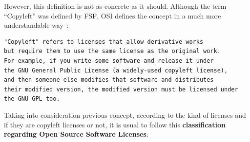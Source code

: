 \documentclass[a4paper, 12pt]{book}
\begin{document}
However, this definition is not as concrete as it should. Although the term ``Copyleft'' was defined by FSF, OSI defines the concept in a much more understandable way~\cite{OSICopyleft}:
\begin{verbatim}
"Copyleft" refers to licenses that allow derivative works
but require them to use the same license as the original work.
For example, if you write some software and release it under
the GNU General Public License (a widely-used copyleft license),
and then someone else modifies that software and distributes
their modified version, the modified version must be licensed under
the GNU GPL too.
\end{verbatim}
Taking into consideration previous concept, according to the kind of licenses and if they are copyleft licenses or not, it is usual to follow this \textbf{classification regarding Open Source Software Licenses}:
\end{document}
